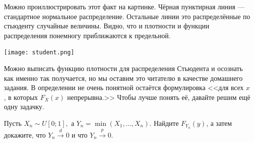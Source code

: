 \documentclass[12pt, a4paper, oneside]{article}
\begin{document}
Можно проиллюстрировать этот факт на картинке. Чёрная пунктирная линия --- стандартное нормальное распределение. Остальные линии это распределённые по стьюденту случайные величины. Видно, что и плотности и функции распределения понемногу приближаются к предельной. 

\begin{center} 
\texttt{[image: student.png]}
\end{center} 

Можно выписать функцию плотности для распределения Стьюдента и осознать как именно так получается, но мы оставим это читателю в качестве домашнего задания. В определении не очень понятной остаётся формулировка <<для всех $x$, в которых $F_X(x)$ непрерывна.>> Чтобы лучше понять её, давайте решим ещё одну задачку.

\begin{problem}{ } 
Пусть $X_n \sim U[0;1],$ а $Y_n = \min(X_1, \ldots, X_n).$ Найдите $F_{Y_n}(y)$, а затем докажите, что $Y_n \overset{d}{\to} 0$ и что  $Y_n \overset{p}{\to} 0.$
\end{problem} 
\end{document}
